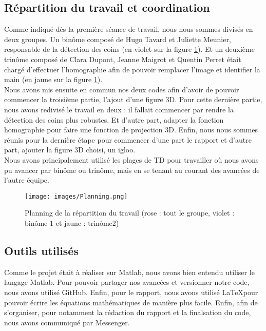 \documentclass[blue]{ceri/sty/rapport}
\begin{document}
\subsection{Répartition du travail et coordination}
Comme indiqué dès la première séance de travail,  nous nous sommes divisés en deux groupes. Un binôme composé de Hugo Tavard et Juliette Meunier, responsable de la détection des coins (en violet sur la figure 
 \ref{fig:uapv}). Et un deuxième trinôme composé de Clara Dupont, Jeanne Maigrot et Quentin Perret était chargé d'effectuer l'homographie afin de pouvoir remplacer l'image et identifier la main (en jaune sur la figure  \ref{fig:uapv}).
\\

Nous avons mis ensuite en commun nos deux codes afin d'avoir de pouvoir commencer la troisième partie, l'ajout d'une figure 3D. Pour cette dernière partie, nous avons redivisé le travail en deux : il fallait commencer par rendre la détection des coins plus robustes. Et d'autre part, adapter la fonction homographie pour faire une fonction de projection 3D. Enfin, nous nous sommes réunis pour la dernière étape pour commencer d'une part le rapport et d'autre part, ajouter la figure 3D choisi, un igloo.
\\

Nous avons principalement utilisé les plages de TD pour travailler où nous avons pu avancer par binôme ou trinôme, mais en se tenant au courant des avancées de l'autre équipe.

\begin{figure}[htb!]
\centering
\texttt{[image: images/Planning.png]}
\caption[planning]{Planning de la répartition du travail (rose : tout le groupe, violet : binôme 1 et jaune : trinôme2)}
\label{fig:uapv}
\end{figure}

\subsection{Outils utilisés}
Comme le projet était à réaliser sur Matlab, nous avons bien entendu utiliser le langage Matlab. Pour pouvoir partager nos avancées et versionner notre code, nous avons utilisé GitHub.
Enfin, pour le rapport, nous avons utilisé \LaTeX  pour pouvoir écrire les équations mathématiques de manière plus facile.
Enfin, afin de s'organiser, pour notamment la rédaction du rapport et la finalsation du code, nous avons communiqué par Messenger.


\end{document}
